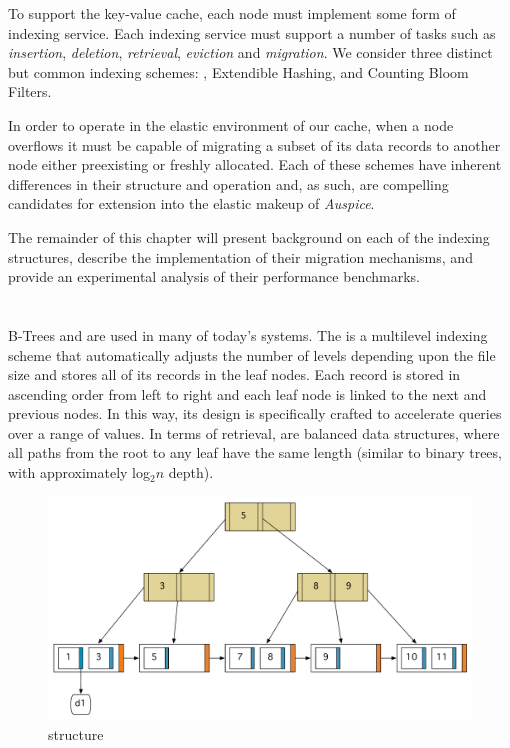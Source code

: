 To support the key-value cache, each node must implement some form of indexing
service. Each indexing service must support a number of tasks such as
\emph{insertion}, \emph{deletion}, \emph{retrieval}, \emph{eviction} and
\emph{migration}. We consider three distinct but common indexing schemes:
\bptrees\cite{btree,bplustree}, Extendible Hashing\cite{ullman}, and
Counting Bloom Filters\cite{countingbloom1,countingbloom2}.

In order to operate in the elastic environment of our cache, when a node
overflows it must be capable of migrating a subset of its data records to
another node either preexisting or freshly allocated. Each of these schemes
have inherent differences in their structure and operation and, as such, are
compelling candidates for extension into the elastic makeup of \emph{Auspice}.

The remainder of this chapter will present background on each of the indexing
structures, describe the implementation of their migration mechanisms, and
provide an experimental analysis of their performance benchmarks.

\section{\bptrees} %
\label{sec:b_trees}
B-Trees and \bptrees are used in many of today's systems. The \bptree is a
multilevel indexing scheme that automatically adjusts the number of levels
depending upon the file size and stores all of its records in the leaf nodes.
Each record is stored in ascending order from left to right and each leaf node
is linked to the next and previous nodes. In this way, its design is
specifically crafted to accelerate queries over a range of
values\cite{navathe,ullman}. In terms of retrieval, \bptrees are balanced data
structures, where all paths from the root to any leaf have the same length
(similar to binary trees, with approximately log$_2 n$ depth).

\begin{figure}
\begin{center}
\includegraphics[scale=0.5]{figures/bplustree.pdf}
\end{center}
\caption{\bptree structure}
\label{fig:bplustree}
\end{figure}

